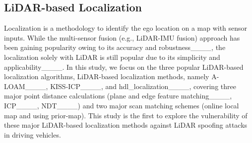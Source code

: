\subsection{LiDAR-based Localization} \label{sec:lidar_slam}
Localization is a methodology to identify the ego location on a map with sensor inputs. While the multi-sensor fusion (e.g., LiDAR-IMU fusion) approach has been gaining popularity owing to its accuracy and robustness____, the localization solely with LiDAR is still popular due to its simplicity and applicability____. In this study, we focus on the three popular LiDAR-based localization algorithms, LiDAR-based localization methods, namely A-LOAM____, KISS-ICP____, and hdl\_localization____, covering three major point distance calculations (plane and edge feature matching____, ICP____, NDT____) and two major scan matching schemes (online local map and using prior-map).
This study is the first to explore the vulnerability of these major LiDAR-based localization methods against LiDAR spoofing attacks in driving vehicles.


